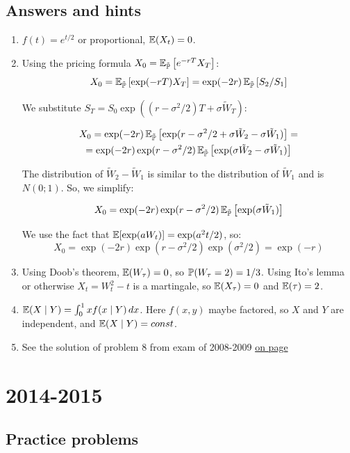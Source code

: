 \documentclass[12pt, a4paper]{article}
\begin{document}
\subsection{Answers and hints}

\begin{enumerate}
\item $f(t)=e^{t/2}$ or proportional, $\E(X_t)=0$.
\item Using the pricing formula $X_0=\E_{\tilde{\P}} \left[e^{-rT}X_T \right]$:
\[
X_0=\E_{\tilde{\P}} \left[\exp(-rT)X_T \right]=\exp(-2r)\E_{\tilde{\P}} \left[S_2/S_1 \right]
\]

We substitute $S_T=S_0 \exp((r-\sigma^2/2)T+\sigma \tilde{W}_T)$:

\begin{multline}
X_0=\exp(-2r)\E_{\tilde{\P}} \left[ \exp(r-\sigma^2/2+\sigma \tilde{W}_2 - \sigma \tilde{W}_1  ) \right] = \\
=\exp(-2r) \exp(r-\sigma^2/2) \E_{\tilde{\P}} \left[  \exp(\sigma \tilde{W}_2 - \sigma \tilde{W}_1  )  \right]
\end{multline}

The distribution of $\tilde{W}_2 - \tilde{W}_1$ is similar to the distribution of $\tilde{W}_1$ and is $N(0;1)$. So, we simplify:

\[
X_0= \exp(-2r) \exp(r-\sigma^2/2) \E_{\tilde{\P}}
\left[  \exp(\sigma \tilde{W}_1 )  \right]
\]

We use the fact that $\E[\exp(a W_t)]=\exp(a^2 t/ 2)$, so:
\[
X_0=\exp(-2r) \exp(r-\sigma^2/2)  \exp(\sigma^2 / 2)=\exp(-r)
\]

\item Using Doob's theorem, $\E(W_{\tau})=0$, so $\P(W_{\tau}=2)=1/3$. Using Ito's lemma or otherwise $X_t=W_t^2-t$ is a martingale, so $\E(X_{\tau})=0$ and $\E(\tau)=2$.
\item $\E(X \mid Y)= \int_0^1 x f(x \mid Y) \, dx$. Here $f(x,y)$ maybe factored, so $X$ and $Y$ are independent, and $\E(X \mid Y)=const$.
\item See the solution of problem 8 from exam of 2008-2009 \hyperref[spiral_wiener]{on page \pageref{spiral_wiener}}

\end{enumerate}

\section{2014-2015}

\subsection{Practice problems}
\end{document}
